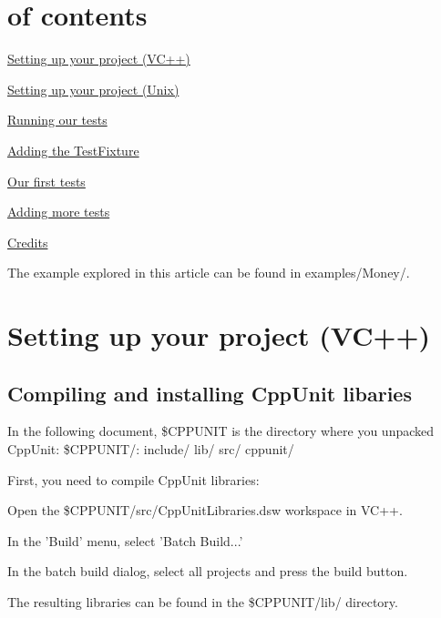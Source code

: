 \hypertarget{money_example_Table}{}\section{of contents}\label{money_example_Table}

\begin{DoxyItemize}
\item \hyperlink{money_example_sec_setting_vc}{Setting up your project (VC++)}
\item \hyperlink{money_example_sec_setting_unix}{Setting up your project (Unix)}
\item \hyperlink{money_example_sec_running_test}{Running our tests}
\item \hyperlink{money_example_sec_adding_testfixture}{Adding the TestFixture}
\item \hyperlink{money_example_sec_first_tests}{Our first tests}
\item \hyperlink{money_example_sec_more_tests}{Adding more tests}
\item \hyperlink{money_example_sec_credits}{Credits}
\end{DoxyItemize}

The example explored in this article can be found in {\ttfamily examples/Money/}.\hypertarget{money_example_sec_setting_vc}{}\section{Setting up your project (VC++)}\label{money_example_sec_setting_vc}
\hypertarget{money_example_sec_install}{}\subsection{Compiling and installing CppUnit libaries}\label{money_example_sec_install}
In the following document, \$CPPUNIT is the directory where you unpacked CppUnit: \$CPPUNIT/: include/ lib/ src/ cppunit/

First, you need to compile CppUnit libraries:
\begin{DoxyItemize}
\item Open the \$CPPUNIT/src/CppUnitLibraries.dsw workspace in VC++.
\item In the 'Build' menu, select 'Batch Build...'
\item In the batch build dialog, select all projects and press the build button.
\item The resulting libraries can be found in the \$CPPUNIT/lib/ directory.
\end{DoxyItemize}

